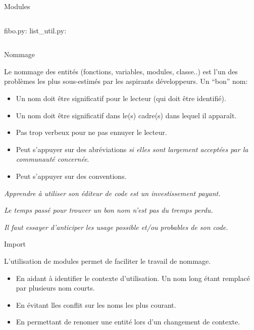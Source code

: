\documentclass{beamer}
\begin{document}
\begin{frame}[fragile]{Modules}
  \begin{columns}
    fibo.py:
    \newline
    \fbox{}
    list\_util.py:
    \newline
    \fbox{}
  \end{columns}
  \fbox{}
\end{frame}

\begin{frame}[fragile]{Nommage}
  
  Le nommage des entités (fonctions, variables, modules, classe..) est l'un des problèmes les plus sous-estimés par les aspirants développeurs.\linebreak
  Un ``bon'' nom:
  \begin{itemize}
  \item Un nom doit être significatif pour le lecteur (qui doit être identifié).
  \item Un nom doit être significatif dans le(s) cadre(s) dans lequel il apparaît.
  \item Pas trop verbeux pour ne pas ennuyer le lecteur.
  \item Peut s'appuyer sur des abréviations {\em si elles sont largement acceptées par la communauté concernée}.
  \item Peut s'appuyer sur des conventions.
  \end{itemize}

  {\em Apprendre à utiliser son éditeur de code est un investissement payant.}

  {\em Le temps passé pour trouver un bon nom n'est pas du tremps perdu.}

  {\em Il faut essayer d'anticiper les usage possible et/ou probables de son code.}
  
\end{frame}

\begin{frame}[fragile]{Import}
  
  L'utilisation de modules permet de faciliter le travail de nommage.
  \begin{itemize}
  \item En aidant à identifier le contexte d'utilisation. Un nom long étant remplacé par plusieurs nom courts.
  \item En évitant lles conflit sur les noms les plus courant.
  \item En permettant de renomer une entité lors d'un changement de contexte.
  \end{itemize}
  \fbox{}
  \fbox{}
\end{frame}
\end{document}
